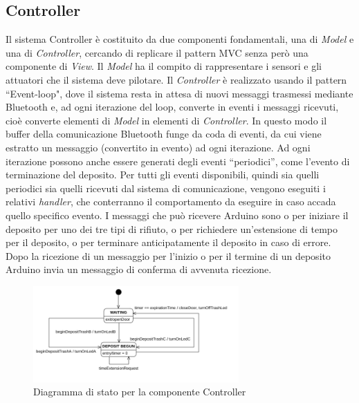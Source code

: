 \documentclass[a4paper, 12pt]{report}
\begin{document}
			\subsection{Controller}
			Il sistema Controller è costituito da due componenti fondamentali, una di \textit{Model}
			e una di \textit{Controller}, cercando di replicare il pattern MVC senza però una componente
			di \textit{View}. Il \textit{Model} ha il compito di rappresentare i sensori e gli attuatori
			che il sistema deve pilotare. Il \textit{Controller} è realizzato usando il pattern ``Event-loop", dove il
			sistema resta in attesa di nuovi messaggi trasmessi mediante Bluetooth e, ad ogni iterazione del 
			loop, converte in eventi i messaggi ricevuti, cioè converte elementi di \textit{Model} in
			elementi di \textit{Controller}. In questo modo il buffer della comunicazione Bluetooth funge da 
			coda di eventi, da cui viene estratto un messaggio (convertito in evento) ad ogni iterazione.\newline
			Ad ogni iterazione possono anche essere generati degli eventi ``periodici'', come l'evento di terminazione 
			del deposito. Per tutti gli eventi disponibili, quindi sia quelli periodici sia quelli ricevuti dal 
			sistema di comunicazione, vengono eseguiti i relativi \textit{handler}, che
			conterranno il comportamento da eseguire in caso accada quello specifico evento. I
			messaggi che può ricevere Arduino sono o per iniziare il deposito per uno dei tre
			tipi di rifiuto, o per richiedere un'estensione di tempo per il deposito, o per terminare
			anticipatamente il deposito in caso di errore. Dopo la ricezione di un messaggio per l'inizio
			o per il termine di un deposito Arduino invia un messaggio di conferma di avvenuta ricezione.
			\begin{figure}[H]
				\centering
				\includegraphics[width=0.7\textwidth]{"img/ControllerStatechart"}    
				\caption{Diagramma di stato per la componente Controller}
			\end{figure}
\end{document}
